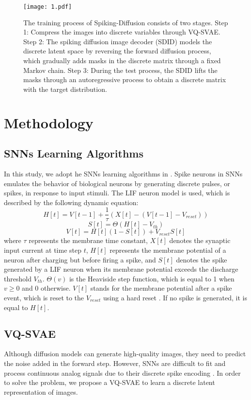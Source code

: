 \documentclass{article}
\begin{document}
\begin{figure*}[htb]
\centering
\texttt{[image: 1.pdf]}
\caption{The training process of Spiking-Diffusion consists of two stages. Step 1: Compress the images into discrete variables through VQ-SVAE. Step 2: The spiking diffusion image decoder (SDID) models the discrete latent space by reversing the forward diffusion process, which gradually adds masks in the discrete matrix through a fixed Markov chain. Step 3: During the test process, the SDID lifts the masks through an autoregressive process to obtain a discrete matrix with the target distribution.}
\label{fig1}
\end{figure*}

\section{Methodology}
\subsection{SNNs Learning Algorithms}
In this study, we adopt he SNNs learning algorithms in \cite{b41}. Spike neurons in SNNs emulates the behavior of biological neurons by generating discrete pulses, or spikes, in response to input stimuli. The LIF neuron model \cite{b42} is used, which is described by the following dynamic equation:
\begin{equation}
    H[t]=V[t-1]+\frac{1}{\tau}(X[t]-(V[t-1]-V_{reset}))
\end{equation}
\begin{equation}
    S[t]=\Theta(H[t]-V_{th})
\end{equation}
\begin{equation}
    V[t]=H[t](1-S[t])+V_{reset}S[t]
\end{equation}
where $\tau$ represents the membrane time constant, $X[t]$ denotes the synaptic input current at time step $t$, $H[t]$ represents the membrane potential of a neuron after charging but before firing a spike, and $S[t]$ denotes the spike generated by a LIF neuron when its membrane potential exceeds the discharge threshold $V_{th}$. $\Theta(v)$ is the Heaviside step function, which is equal to 1 when $v\geq0$ and 0 otherwise. $V[t]$ stands for the membrane potential after a spike event, which is reset to the $V_{reset}$ using a hard reset \cite{b43}. If no spike is generated, it is equal to $H[t]$.

\subsection{VQ-SVAE}
Although diffusion models \cite{b5} can generate high-quality images, they need to predict the noise added in the forward step. However, SNNs are difficult to fit and process continuous analog signals due to their discrete spike encoding \cite{b26}.  In order to solve the problem, we propose a VQ-SVAE to learn a discrete latent representation of images.
\end{document}
